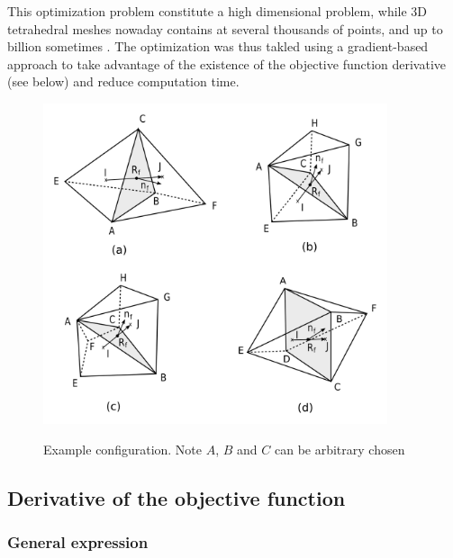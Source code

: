 \documentclass[11pt]{article}
\begin{document}
This optimization problem constitute a high dimensional problem, while 3D tetrahedral meshes nowaday contains at several thousands of points, and up to billion sometimes \cite{neau_massively_2020}.
The optimization was thus takled using a gradient-based approach to take advantage of the existence of the objective function derivative (see below) and reduce computation time.

\begin{figure}[h!]
  \centering
  \includegraphics[width=0.9\textwidth]{figures/cases.png}
  \label{cases_figure}
  \caption{Example configuration. Note $A$, $B$ and $C$ can be arbitrary chosen}
\end{figure}



\subsection{Derivative of the objective function}

\subsubsection{General expression}
\end{document}
